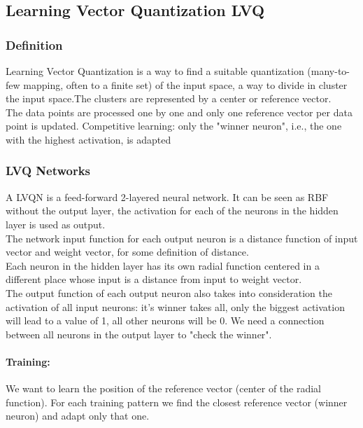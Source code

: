 \documentclass{article}
\begin{document}
	\subsection{Learning Vector Quantization LVQ}
	
	\subsubsection{Definition}
	Learning Vector Quantization is a way to find a suitable quantization (many-to-few mapping, often to a finite set) of the input space, a way to divide in cluster the input space.The clusters are represented by a center or reference vector.\\
	
	The data points are processed one by one and only one reference vector per data point is updated. Competitive learning: only the "winner neuron", i.e., the one with the highest activation, is adapted
	
	\subsubsection{LVQ Networks}
	A LVQN is a feed-forward 2-layered neural network. It can be seen as RBF without the output layer, the activation for each of the neurons in the hidden layer is used as output.\\
	
	The network input function for each output neuron is a distance function of input vector and weight vector, for some definition of distance.\\
	Each neuron in the hidden layer has its own radial function centered in a different place whose input is a distance from input to weight vector.\\
	
	The output function of each output neuron also takes into consideration the activation of all input neurons: it's winner takes all, only the biggest activation will lead to a value of 1, all other neurons will be 0. We need a connection between all neurons in the output layer to "check the winner".\\
	
	\paragraph{Training:} We want to learn the position of the reference vector (center of the radial function). For each training pattern we find the closest reference vector (winner neuron) and adapt only that one. \\
	
\end{document}
